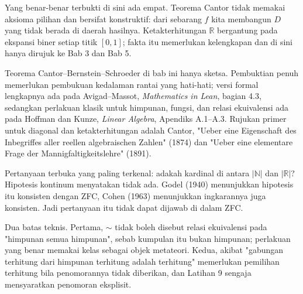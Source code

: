 \begin{untukpeneliti}
Yang benar-benar terbukti di sini ada empat. Teorema Cantor tidak memakai aksioma
pilihan dan bersifat konstruktif: dari sebarang $f$ kita membangun $D$ yang tidak
berada di daerah hasilnya. Ketakterhitungan $\mathbb{R}$ bergantung pada ekspansi biner
setiap titik $[0,1]$; fakta itu memerlukan kelengkapan dan di sini hanya dirujuk ke
Bab 3 dan Bab 5.

Teorema Cantor--Bernstein--Schroeder di bab ini hanya sketsa. Pembuktian penuh
memerlukan pembukuan kedalaman rantai yang hati-hati; versi formal lengkapnya ada
pada Avigad--Massot, \emph{Mathematics in Lean}, bagian 4.3, sedangkan perlakuan
klasik untuk himpunan, fungsi, dan relasi ekuivalensi ada pada Hoffman dan Kunze,
\emph{Linear Algebra}, Apendiks A.1--A.3. Rujukan primer untuk diagonal dan
ketakterhitungan adalah Cantor, "Ueber eine Eigenschaft des Inbegriffes aller
reellen algebraischen Zahlen" (1874) dan "Ueber eine elementare Frage der
Mannigfaltigkeitslehre" (1891).

Pertanyaan terbuka yang paling terkenal: adakah kardinal di antara $|\mathbb{N}|$ dan
$|\mathbb{R}|$? Hipotesis kontinum menyatakan tidak ada. Godel (1940) menunjukkan
hipotesis itu konsisten dengan ZFC, Cohen (1963) menunjukkan ingkarannya juga konsisten.
Jadi pertanyaan itu tidak dapat dijawab di dalam ZFC.

Dua batas teknis. Pertama, $\sim$ tidak boleh disebut relasi ekuivalensi pada
"himpunan semua himpunan", sebab kumpulan itu bukan himpunan; perlakuan yang benar
memakai kelas sebagai objek metateori. Kedua, akibat "gabungan terhitung dari himpunan
terhitung adalah terhitung" memerlukan pemilihan terhitung bila penomorannya tidak
diberikan, dan Latihan 9 sengaja mensyaratkan penomoran eksplisit.
\end{untukpeneliti}

